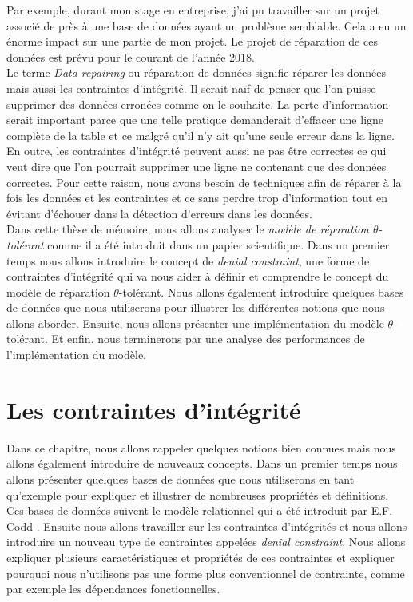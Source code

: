 \documentclass[letterpaper, 12pt]{report}
\theoremstyle{definition}
\newcommand{\alinea}{
\hspace*{0.5cm}}
\begin{document}
Par exemple, durant mon stage en entreprise, j'ai pu travailler sur un projet associé de près à une base de données ayant un problème semblable. Cela a eu un énorme impact sur une partie de mon projet. Le projet de réparation de ces données est prévu pour le courant de l'année 2018.\\

Le terme \emph{Data repairing} ou réparation de données signifie réparer les données mais aussi les contraintes d'intégrité. Il serait naïf de penser que l'on puisse supprimer des données erronées comme on le souhaite. La perte d'information serait important parce que une telle pratique demanderait d'effacer une ligne complète de la table et ce malgré qu'il n'y ait qu'une seule erreur dans la ligne. En outre, les contraintes d'intégrité peuvent aussi ne pas être correctes ce qui veut dire que l'on pourrait supprimer une ligne ne contenant que des données correctes. Pour cette raison, nous avons besoin de techniques afin de réparer à la fois les données et les contraintes et ce sans perdre trop d'information tout en évitant d'échouer dans la détection d'erreurs dans les données.\\

Dans cette thèse de mémoire, nous allons analyser le \emph{modèle de réparation $\theta$-tolérant} comme il a été introduit dans un papier scientifique\cite{main}. Dans un premier temps nous allons introduire le concept de \emph{denial constraint}, une forme de contraintes d'intégrité qui va nous aider à définir et comprendre le concept du modèle de réparation $\theta$-tolérant. Nous allons également introduire quelques bases de données que nous utiliserons pour illustrer les différentes notions que nous allons aborder. Ensuite, nous allons présenter une implémentation du modèle $\theta$-tolérant. Et enfin, nous terminerons par une analyse des performances de l'implémentation du modèle.

\chapter{Les contraintes d'intégrité}

\alinea Dans ce chapitre, nous allons rappeler quelques notions bien connues mais nous allons également introduire de nouveaux concepts. Dans un premier temps nous allons présenter quelques bases de données que nous utiliserons en tant qu'exemple pour expliquer et illustrer de nombreuses propriétés et définitions. Ces bases de données suivent le modèle relationnel qui a été introduit par E.F. Codd \cite{misc1}. Ensuite nous allons travailler sur les contraintes d'intégrités et nous allons introduire un nouveau type de contraintes appelées \emph{denial constraint}. Nous allons expliquer plusieurs caractéristiques et propriétés de ces contraintes et expliquer pourquoi nous n'utilisons pas une forme plus conventionnel de contrainte, comme par exemple les dépendances fonctionnelles.
\end{document}
